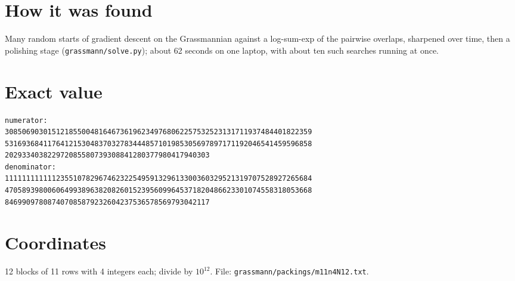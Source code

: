 \documentclass[11pt,a4paper]{article}
\begin{document}
\section{How it was found}
Many random starts of gradient descent on the Grassmannian against a log-sum-exp of the pairwise overlaps, sharpened over time, then a polishing stage (\texttt{grassmann/solve.py}); about 62 seconds on one laptop, with about ten such searches running at once.


\appendix
\section{Exact value}
{\small
\begin{verbatim}
numerator:
308506903015121855004816467361962349768062257532523131711937484401822359
531693684117641215304837032783444857101985305697897171192046541459596858
202933403822972085580739308841280377980417940303
denominator:
111111111111235510782967462322549591329613300360329521319707528927265684
470589398006064993896382082601523956099645371820486623301074558318053668
846990978087407085879232604237536578569793042117
\end{verbatim}}

\section{Coordinates}
12 blocks of 11 rows with 4 integers each; divide by $10^{12}$. File: \texttt{grassmann/packings/m11n4N12.txt}.
{\tiny
\begin{multicols}{3}
\end{multicols}}
\end{document}

